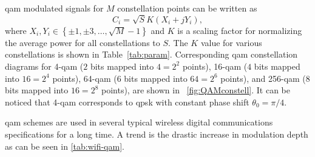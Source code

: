\Gls{qam} modulated signals for $M$ constellation points can be written as
%
\begin{equation*}
C_i=\sqrt{S}K(X_i + jY_i),
\end{equation*}
%
where $X_i, Y_i \in \left\lbrace\pm 1, \pm 3,\ldots,\sqrt{M}-1 \right\rbrace$ and $K$ is a scaling factor for normalizing the average power for all constellations to $S$. The $K$ value for various constellations is shown in Table~\ref{tab:param}. Corresponding \gls{qam} constellation diagrams for 4-\gls{qam} ($2$ bits mapped into $4=2^2$ points), 16-\gls{qam} ($4$ bits mapped into $16=2^4$ points), 64-\gls{qam} ($6$ bits mapped into $64=2^6$ points), and 256-\gls{qam} ($8$ bits mapped into $16=2^8$ points), are shown in ~\cref{fig:QAMconstell}. It can be noticed that 4-\gls{qam} corresponds to \gls{qpsk} with constant phase shift $\theta_0 =\pi/4$. 

\Gls{qam} schemes are used in several typical wireless digital communications specifications for a long time. A trend is the drastic increase in modulation depth as can be seen in \cref{tab:wifi-qam}.




%

